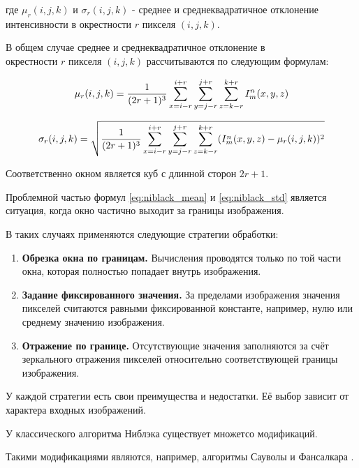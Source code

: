 где \(\mu_r(i, j, k)\) и \(\sigma_r(i, j, k)\) - среднее и среднеквадратичное отклонение интенсивности в окрестности \(r\) пикселя \((i, j, k)\).

В общем случае среднее и среднеквадратичное отклонение в \\ окрестности \(r\) пикселя \((i, j, k)\) рассчитываются по следующим формулам:

\begin{equation}\label{eq:niblack_mean}
    \mu_r(i, j, k) = \frac{1}{(2r + 1)^3} \sum_{x = i - r}^{i + r} \sum_{y = j - r}^{j + r} \sum_{z = k - r}^{k + r} I^n_m(x, y, z)
\end{equation}

\begin{equation}\label{eq:niblack_std}
    \sigma_r(i, j, k) = \sqrt{\frac{1}{(2r + 1)^3} \sum_{x = i - r}^{i + r} \sum_{y = j - r}^{j + r} \sum_{z = k - r}^{k + r} (I^n_m(x, y, z) - \mu_r(i, j, k))^2}
\end{equation}

Соответственно окном является куб с длинной сторон \(2r + 1\). 

Проблемной частью формул \ref{eq:niblack_mean} и \ref{eq:niblack_std} является ситуация, когда окно частично выходит за границы изображения.

В таких случаях применяются следующие стратегии обработки:

\begin{enumerate}
    \item \textbf{Обрезка окна по границам.} Вычисления проводятся только по той части окна, которая полностью попадает внутрь изображения.
    
    \item \textbf{Задание фиксированного значения.} За пределами изображения значения пикселей считаются равными фиксированной константе, например, нулю или среднему значению изображения.
    
    \item \textbf{Отражение по границе.} Отсутствующие значения заполняются за счёт зеркального отражения пикселей относительно соответствующей границы изображения.
\end{enumerate}

У каждой стратегии есть свои преимущества и недостатки. Её выбор зависит от характера входных изображений.

У классического алгоритма Ниблэка существует множетсо модификаций.

Такими модификациями являются, например, алгоритмы Сауволы \cite{sauvola2000adaptive} и Фансалкара \cite{phansalkar2011adaptive}.

